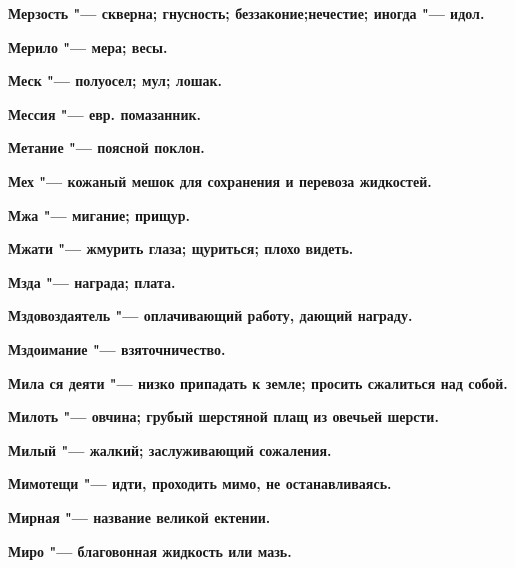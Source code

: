 \bfseries Мерзость \normalfont{} "--- скверна; гнусность; беззаконие;нечестие; иногда "--- идол. 




\bfseries Мерило \normalfont{} "--- мера; весы. 




\bfseries Меск \normalfont{} "--- полуосел; мул; лошак. 




\bfseries Мессия \normalfont{} "--- евр. помазанник. 




\bfseries Метание \normalfont{} "--- поясной поклон. 




\bfseries Мех \normalfont{} "--- кожаный мешок для сохранения и перевоза жидкостей. 




\bfseries Мжа \normalfont{} "--- мигание; прищур. 




\bfseries Мжати \normalfont{} "--- жмурить глаза; щуриться; плохо видеть. 




\bfseries Мзда \normalfont{} "--- награда; плата. 




\bfseries Мздовоздаятель \normalfont{} "--- оплачивающий работу, дающий награду. 




\bfseries Мздоимание \normalfont{} "--- взяточничество. 




\bfseries Мила ся деяти \normalfont{} "--- низко припадать к земле; просить сжалиться над собой. 




\bfseries Милоть \normalfont{} "--- овчина; грубый шерстяной плащ из овечьей шерсти. 




\bfseries Милый \normalfont{} "--- жалкий; заслуживающий сожаления. 




\bfseries Мимотещи \normalfont{} "--- идти, проходить мимо, не останавливаясь. 




\bfseries Мирная \normalfont{} "--- название великой ектении. 




\bfseries Миро \normalfont{} "--- благовонная жидкость или мазь. 




